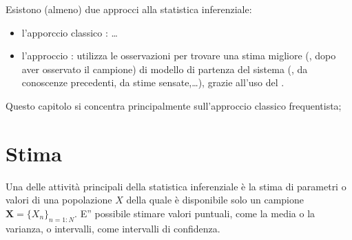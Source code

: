 \documentclass[letterpaper,10pt,italian]{jupyterBook}
\begin{document}
\sphinxAtStartPar
Esistono (almeno) due approcci alla statistica inferenziale:
\begin{itemize}
\item {} 
\sphinxAtStartPar
l’apporccio classico : …  

\item {} 
\sphinxAtStartPar
l’approccio : utilizza le osservazioni per trovare una stima migliore (, dopo aver osservato il campione) di modello di partenza del sistema (, da conoscenze precedenti, da stime sensate,…), grazie all’uso del {\hyperref[\detokenize{ch/statistics/random_variables_discrete:statistics-hs-random-variables-bayes-discrete}]{}}.

\end{itemize}

\sphinxAtStartPar
Questo capitolo si concentra principalmente sull’approccio classico frequentista;      

\sphinxAtStartPar
{} 





\sphinxstepscope


\section{Stima}
\label{\detokenize{ch/statistics/estimate:stima}}\label{\detokenize{ch/statistics/estimate:statistics-hs-inference-estimate}}\label{\detokenize{ch/statistics/estimate::doc}}
\sphinxAtStartPar
Una delle attività principali della statistica inferenziale è la stima di parametri o valori di una popolazione \(X\) della quale è disponibile solo un campione \(\mathbf{X} = \{ X_n \}_{n=1:N}\). E” possibile stimare valori puntuali, come la media o la varianza, o intervalli, come intervalli di confidenza.  
\end{document}
